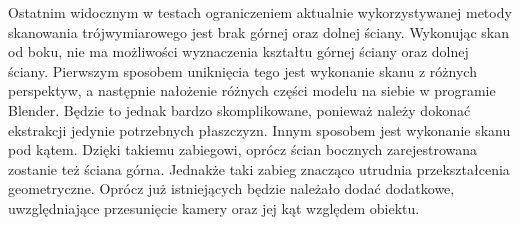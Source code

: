 Ostatnim widocznym w testach ograniczeniem aktualnie wykorzystywanej metody skanowania trójwymiarowego jest brak górnej oraz dolnej ściany. Wykonując skan od boku, nie ma możliwości wyznaczenia kształtu górnej ściany oraz dolnej ściany. Pierwszym sposobem uniknięcia tego jest wykonanie skanu z różnych perspektyw, a następnie nałożenie różnych części modelu na siebie w programie Blender. Będzie to jednak bardzo skomplikowane, ponieważ należy dokonać ekstrakcji jedynie potrzebnych płaszczyzn. Innym sposobem jest wykonanie skanu pod kątem. Dzięki takiemu zabiegowi, oprócz ścian bocznych zarejestrowana zostanie też ściana górna. Jednakże  taki zabieg znacząco utrudnia przekształcenia geometryczne. Oprócz już istniejących będzie należało dodać dodatkowe, uwzględniające przesunięcie kamery oraz jej kąt względem obiektu.
\newpage



